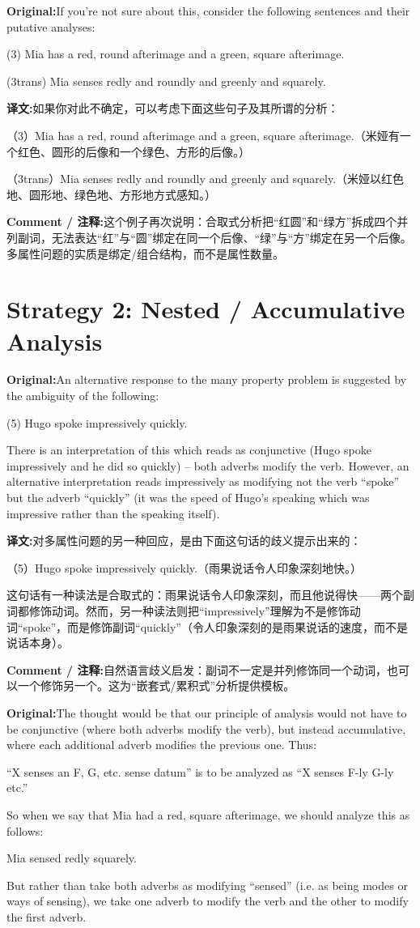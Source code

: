 \documentclass[11pt,a4paper]{article}
\newcommand{\eng}[1]{\begin{engbox}\noindent\textbf{Original:}\quad #1\end{engbox}}
\newcommand{\cn}[1]{\begin{cnbox}\noindent\textbf{译文:}\quad #1\end{cnbox}}
\newcommand{\cmt}[1]{\begin{commentbox}\noindent\textbf{Comment / 注释:}\quad #1\end{commentbox}}
\begin{document}
\eng{If you’re not sure about this, consider the following sentences and their putative analyses:

(3) Mia has a red, round afterimage and a green, square afterimage.

(3trans) Mia senses redly and roundly and greenly and squarely.}

\cn{如果你对此不确定，可以考虑下面这些句子及其所谓的分析：

（3）Mia has a red, round afterimage and a green, square afterimage.（米娅有一个红色、圆形的后像和一个绿色、方形的后像。）

（3trans）Mia senses redly and roundly and greenly and squarely.（米娅以红色地、圆形地、绿色地、方形地方式感知。）}

\cmt{这个例子再次说明：合取式分析把“红圆”和“绿方”拆成四个并列副词，无法表达“红”与“圆”绑定在同一个后像、“绿”与“方”绑定在另一个后像。多属性问题的实质是绑定/组合结构，而不是属性数量。}

\section{Strategy 2: Nested / Accumulative Analysis}

\eng{An alternative response to the many property problem is suggested by the ambiguity of the following:

(5) Hugo spoke impressively quickly.

There is an interpretation of this which reads as conjunctive (Hugo spoke impressively and he did so quickly) – both adverbs modify the verb. However, an alternative interpretation reads impressively as modifying not the verb “spoke” but the adverb “quickly” (it was the speed of Hugo’s speaking which was impressive rather than the speaking itself).}

\cn{对多属性问题的另一种回应，是由下面这句话的歧义提示出来的：

（5）Hugo spoke impressively quickly.（雨果说话令人印象深刻地快。）

这句话有一种读法是合取式的：雨果说话令人印象深刻，而且他说得快——两个副词都修饰动词。然而，另一种读法则把“impressively”理解为不是修饰动词“spoke”，而是修饰副词“quickly”（令人印象深刻的是雨果说话的速度，而不是说话本身）。}

\cmt{自然语言歧义启发：副词不一定是并列修饰同一个动词，也可以一个修饰另一个。这为“嵌套式/累积式”分析提供模板。}

\eng{The thought would be that our principle of analysis would not have to be conjunctive (where both adverbs modify the verb), but instead accumulative, where each additional adverb modifies the previous one. Thus:

“X senses an F, G, etc. sense datum” is to be analyzed as “X senses F-ly G-ly etc.”

So when we say that Mia had a red, square afterimage, we should analyze this as follows:

Mia sensed redly squarely.

But rather than take both adverbs as modifying “sensed” (i.e. as being modes or ways of sensing), we take one adverb to modify the verb and the other to modify the first adverb.}
\end{document}
